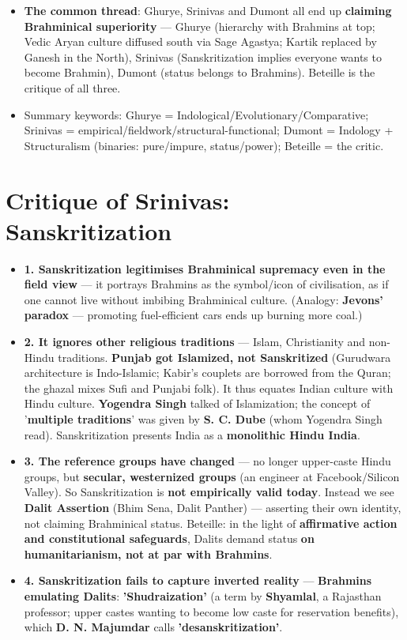 \begin{CriticalPoint}
\begin{itemize}
\item \textbf{The common thread}: Ghurye, Srinivas and Dumont all end up \textbf{claiming Brahminical superiority} --- Ghurye (hierarchy with Brahmins at top; Vedic Aryan culture diffused south via Sage Agastya; Kartik replaced by Ganesh in the North), Srinivas (Sanskritization implies everyone wants to become Brahmin), Dumont (status belongs to Brahmins). Beteille is the critique of all three.
\item Summary keywords: Ghurye = Indological/Evolutionary/Comparative; Srinivas = empirical/fieldwork/structural-functional; Dumont = Indology + Structuralism (binaries: pure/impure, status/power); Beteille = the critic.
\end{itemize}
\end{CriticalPoint}

\section{Critique of Srinivas: Sanskritization}

\begin{CriticalPoint}
\begin{itemize}
\item \textbf{1. Sanskritization legitimises Brahminical supremacy even in the field view} --- it portrays Brahmins as the symbol/icon of civilisation, as if one cannot live without imbibing Brahminical culture. (Analogy: \textbf{Jevons' paradox} --- promoting fuel-efficient cars ends up burning more coal.)
\item \textbf{2. It ignores other religious traditions} --- Islam, Christianity and non-Hindu traditions. \textbf{Punjab got Islamized, not Sanskritized} (Gurudwara architecture is Indo-Islamic; Kabir's couplets are borrowed from the Quran; the ghazal mixes Sufi and Punjabi folk). It thus equates Indian culture with Hindu culture. \textbf{Yogendra Singh} talked of Islamization; the concept of '\textbf{multiple traditions}' was given by \textbf{S. C. Dube} (whom Yogendra Singh read). Sanskritization presents India as a \textbf{monolithic Hindu India}.
\item \textbf{3. The reference groups have changed} --- no longer upper-caste Hindu groups, but \textbf{secular, westernized groups} (an engineer at Facebook/Silicon Valley). So Sanskritization is \textbf{not empirically valid today}. Instead we see \textbf{Dalit Assertion} (Bhim Sena, Dalit Panther) --- asserting their own identity, not claiming Brahminical status. Beteille: in the light of \textbf{affirmative action and constitutional safeguards}, Dalits demand status \textbf{on humanitarianism, not at par with Brahmins}.
\item \textbf{4. Sanskritization fails to capture inverted reality} --- \textbf{Brahmins emulating Dalits}: \textbf{'Shudraization'} (a term by \textbf{Shyamlal}, a Rajasthan professor; upper castes wanting to become low caste for reservation benefits), which \textbf{D. N. Majumdar} calls \textbf{'desanskritization'}.
\end{itemize}
\end{CriticalPoint}

